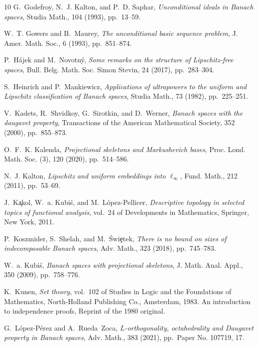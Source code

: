 \documentclass[11pt]{amsart}
\theoremstyle{definition}
\theoremstyle{remark}
\begin{document}
\begin{thebibliography}{10}
{\sc G.~Godefroy, N.~J. Kalton, and P.~D. Saphar}, {\em Unconditional ideals in
  {B}anach spaces}, Studia Math., 104 (1993), pp.~13--59.

{\sc W.~T. Gowers and B.~Maurey}, {\em The unconditional basic sequence
  problem}, J. Amer. Math. Soc., 6 (1993), pp.~851--874.

{\sc P.~H\'{a}jek and M.~Novotn\'{y}}, {\em Some remarks on the structure of
  {L}ipschitz-free spaces}, Bull. Belg. Math. Soc. Simon Stevin, 24 (2017),
  pp.~283--304.

{\sc S.~Heinrich and P.~Mankiewicz}, {\em Applications of ultrapowers to the
  uniform and {L}ipschitz classification of {B}anach spaces}, Studia Math., 73
  (1982), pp.~225--251.

{\sc V.~Kadets, R.~Shvidkoy, G.~Sirotkin, and D.~Werner}, {\em Banach spaces
  with the daugavet property}, Transactions of the American Mathematical
  Society, 352 (2000), pp.~855--873.

{\sc O.~F.~K. Kalenda}, {\em Projectional skeletons and {M}arkushevich bases},
  Proc. Lond. Math. Soc. (3), 120 (2020), pp.~514--586.

{\sc N.~J. Kalton}, {\em Lipschitz and uniform embeddings into
  {$\ell_\infty$}}, Fund. Math., 212 (2011), pp.~53--69.

{\sc J.~K\c{a}kol, W.~a. Kubi\'{s}, and M.~L\'{o}pez-Pellicer}, {\em
  Descriptive topology in selected topics of functional analysis}, vol.~24 of
  Developments in Mathematics, Springer, New York, 2011.

{\sc P.~Koszmider, S.~Shelah, and M.~\'{S}wi\c{e}tek}, {\em There is no bound
  on sizes of indecomposable {B}anach spaces}, Adv. Math., 323 (2018),
  pp.~745--783.

{\sc W.~a. Kubi\'{s}}, {\em Banach spaces with projectional skeletons}, J.
  Math. Anal. Appl., 350 (2009), pp.~758--776.

{\sc K.~Kunen}, {\em Set theory}, vol.~102 of Studies in Logic and the
  Foundations of Mathematics, North-Holland Publishing Co., Amsterdam, 1983.
\newblock An introduction to independence proofs, Reprint of the 1980 original.

{\sc G.~L\'{o}pez-P\'{e}rez and A.~Rueda~Zoca}, {\em {$L$}-orthogonality,
  octahedrality and {D}augavet property in {B}anach spaces}, Adv. Math., 383
  (2021), pp.~Paper No. 107719, 17.


\end{thebibliography}
\end{document}
